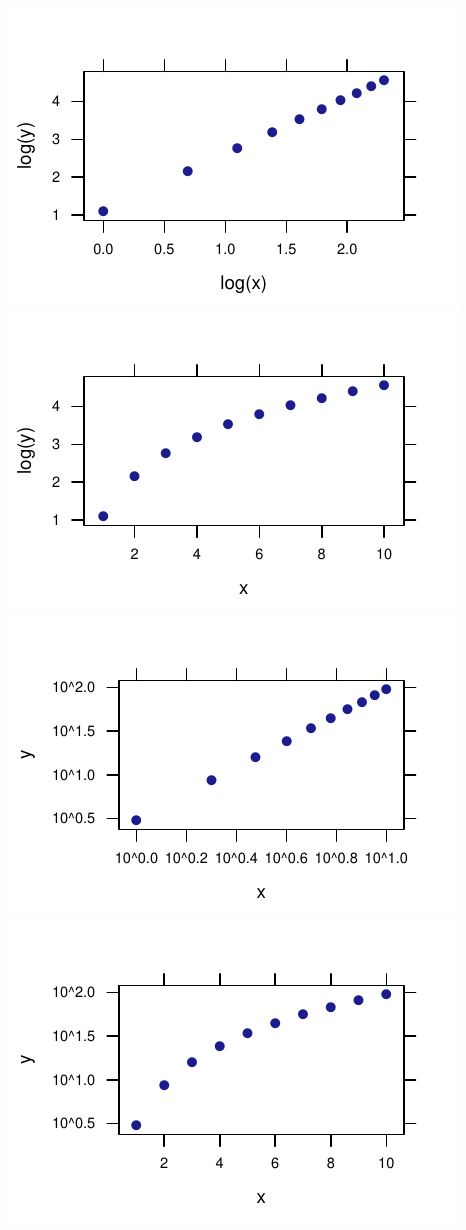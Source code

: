 \documentclass[twoside]{book}\usepackage[]{graphicx}\usepackage[]{xcolor}
\makeatletter
\def\maxwidth{ %
  \ifdim\Gin@nat@width>\linewidth
    \linewidth
  \else
    \Gin@nat@width
  \fi
}
\newenvironment{knitrout}{}{} %
\makeatother
\begin{document}
\begin{knitrout}
{\centering \includegraphics[width=\maxwidth]{figures/fig-unnamed-chunk-203-1} 
\includegraphics[width=\maxwidth]{figures/fig-unnamed-chunk-203-2} 
\includegraphics[width=\maxwidth]{figures/fig-unnamed-chunk-203-3} 
\includegraphics[width=\maxwidth]{figures/fig-unnamed-chunk-203-4} 

}
\end{knitrout}
\end{document}
